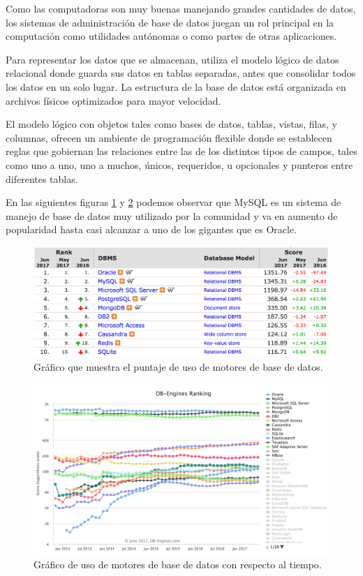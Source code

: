 Como las computadoras son muy buenas manejando grandes cantidades de datos, los sistemas de administración de base de datos juegan un rol principal en la computación como utilidades autónomas o como partes de otras aplicaciones.

Para representar los datos que se almacenan, utiliza el modelo lógico de datos relacional donde guarda sus datos en tablas separadas, antes que consolidar todos los datos en un solo lugar. La estructura de la base de datos está organizada en archivos físicos optimizados para mayor velocidad\citep{ronstrom2004mysql}. 

El modelo lógico con objetos tales como bases de datos, tablas, vistas, filas, y columnas, ofrecen un ambiente de programación flexible donde se establecen reglas que gobiernan las relaciones entre las de los distintos tipos de campos, tales como uno a uno, uno a muchos, únicos, requeridos, u opcionales y punteros entre diferentes tablas.

En las siguientes figuras \ref{graph_db_1} y \ref{graph_db_2} podemos observar que MySQL es un sistema de manejo de base de datos muy utilizado por la comunidad y va en aumento de popularidad hasta casi alcanzar a uno de los gigantes que es Oracle.

\begin{figure}[H]
\centering
\includegraphics[width=125mm,scale=1]{Figuras/tecnologias/rank_db_1}
\caption{Gráfico que muestra el puntaje de uso de motores de base de datos\citep{db_engines_page}.}
  \label{graph_db_1}
\end{figure}

\begin{figure}[H]
\centering
\includegraphics[width=125mm,scale=1]{Figuras/tecnologias/rank_db_2}
\caption{Gráfico de uso de motores de base de datos con respecto al tiempo\citep{db_engines_page}.}
  \label{graph_db_2}
\end{figure}

